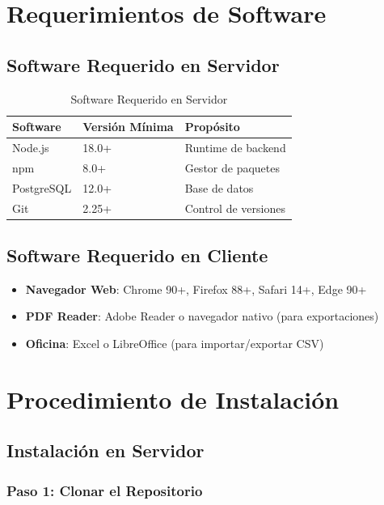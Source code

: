 \documentclass[12pt,a4paper,spanish,oneside]{report}
\begin{document}
\section{Requerimientos de Software}

\subsection{Software Requerido en Servidor}

\begin{table}[H]
\centering
\caption{Software Requerido en Servidor}
\begin{tabular}{|l|l|l|}
\hline
\textbf{Software} & \textbf{Versión Mínima} & \textbf{Propósito} \\
\hline
Node.js & 18.0+ & Runtime de backend \\
\hline
npm & 8.0+ & Gestor de paquetes \\
\hline
PostgreSQL & 12.0+ & Base de datos \\
\hline
Git & 2.25+ & Control de versiones \\
\hline
\end{tabular}
\end{table}

\subsection{Software Requerido en Cliente}

\begin{itemize}
    \item \textbf{Navegador Web}: Chrome 90+, Firefox 88+, Safari 14+, Edge 90+
    \item \textbf{PDF Reader}: Adobe Reader o navegador nativo (para exportaciones)
    \item \textbf{Oficina}: Excel o LibreOffice (para importar/exportar CSV)
\end{itemize}

\section{Procedimiento de Instalación}

\subsection{Instalación en Servidor}

\subsubsection{Paso 1: Clonar el Repositorio}
\end{document}
